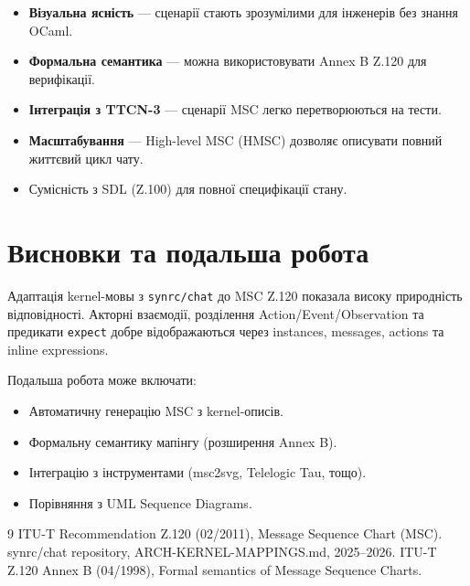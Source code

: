 \documentclass[11pt,a4paper]{article}
\begin{document}
\begin{itemize}
    \item \textbf{Візуальна ясність} — сценарії стають зрозумілими для інженерів без знання OCaml.
    \item \textbf{Формальна семантика} — можна використовувати Annex B Z.120 для верифікації.
    \item \textbf{Інтеграція з TTCN-3} — сценарії MSC легко перетворюються на тести.
    \item \textbf{Масштабування} — High-level MSC (HMSC) дозволяє описувати повний життєвий цикл чату.
    \item Сумісність з SDL (Z.100) для повної специфікації стану.
\end{itemize}

\section{Висновки та подальша робота}

Адаптація kernel-мовы з \texttt{synrc/chat} до MSC Z.120 показала високу природність відповідності. Акторні взаємодії, розділення Action/Event/Observation та предикати \texttt{expect} добре відображаються через instances, messages, actions та inline expressions.

Подальша робота може включати:
\begin{itemize}
    \item Автоматичну генерацію MSC з kernel-описів.
    \item Формальну семантику мапінгу (розширення Annex B).
    \item Інтеграцію з інструментами (msc2svg, Telelogic Tau, тощо).
    \item Порівняння з UML Sequence Diagrams.
\end{itemize}


\begin{thebibliography}{9}
 ITU-T Recommendation Z.120 (02/2011), Message Sequence Chart (MSC).
 synrc/chat repository, ARCH-KERNEL-MAPPINGS.md, 2025--2026.
 ITU-T Z.120 Annex B (04/1998), Formal semantics of Message Sequence Charts.
\end{thebibliography}
\end{document}
